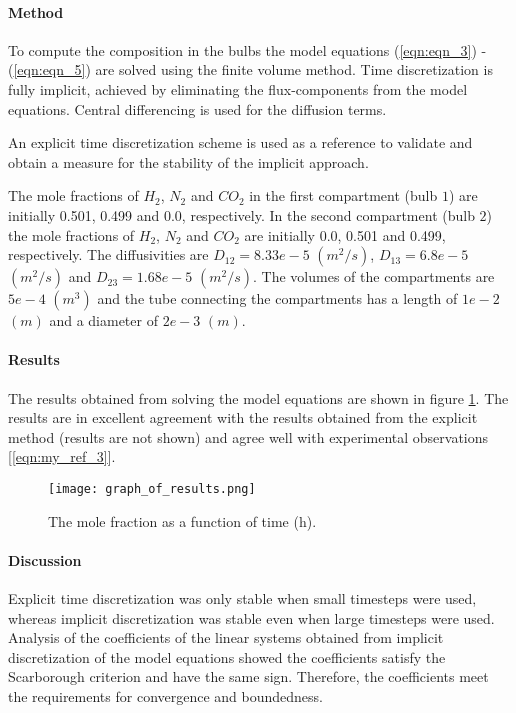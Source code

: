 \documentclass[twocolumn]{article}
\begin{document}
\paragraph*{Method}
To compute the composition in the bulbs the model equations (\ref{eqn:eqn_3}) - (\ref{eqn:eqn_5}) are solved using the finite volume method. Time discretization is fully implicit, achieved by eliminating the flux-components from the model equations. Central differencing is used for the diffusion terms.

An explicit time discretization scheme is used as a reference to validate and obtain a measure for the stability of the implicit approach.

The mole fractions of $H_2$, $N_2$ and $CO_2$ in the first compartment (bulb $1$) are initially 0.501, 0.499 and 0.0, respectively. In the second compartment (bulb $2$) the mole fractions of $H_2$, $N_2$ and $CO_2$ are initially 0.0, 0.501 and 0.499, respectively. The diffusivities are $D_{12} = 8.33e-5$  $(m^2/s)$, $D_{13} = 6.8e-5$ $(m^2/s)$ and $D_{23} = 1.68e-5$ $(m^2/s)$. The volumes of the compartments are $5e-4$ $(m^3)$ and the tube connecting the compartments has a length of $1e-2$ $(m)$ and a diameter of $2e-3$ $(m)$. 

\paragraph*{Results} 
The results obtained from solving the model equations are shown in figure \ref{fig:fig_1}. The results are in excellent agreement with the results obtained from the explicit method (results are not shown) and agree well with experimental observations [\ref{eqn:my_ref_3}].

\begin{figure}
\texttt{[image: graph\_of\_results.png]}
\caption{The mole fraction as a function of time (h).}
\label{fig:fig_1}
\end{figure}

\paragraph*{Discussion}
Explicit time discretization was only stable when small timesteps were used, whereas implicit discretization was stable even when large timesteps were used. Analysis of the coefficients of the linear systems obtained from implicit discretization of the model equations showed the coefficients satisfy the Scarborough criterion and have the same sign. Therefore, the coefficients meet the requirements for convergence and boundedness. 
\end{document}
